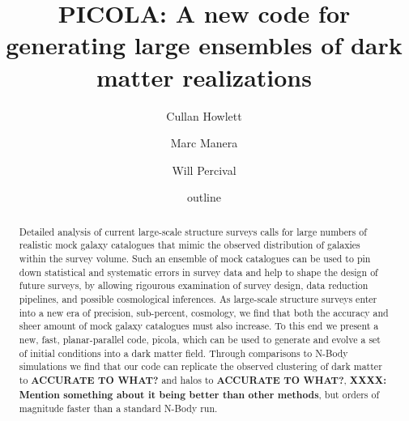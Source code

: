 \documentclass[5p,authoryear]{elsarticle}
\begin{document}
\title{PICOLA: A new code for generating large ensembles of dark matter realizations}

\author[icg]{Cullan Howlett}
\author[icg,ucl]{Marc Manera}
\author[icg]{Will Percival}
\address[icg]{Institute of Cosmology \& Gravitation, Dennis Sciama Building, University of Portsmouth, Portsmouth, PO1 3FX, UK}
\address[ucl]{ENTER UCL ADDRESS HERE...}
\date{outline} 

\begin{abstract}
Detailed analysis of current large-scale structure surveys calls for large numbers of realistic mock galaxy catalogues that mimic the observed distribution of galaxies within the survey volume. Such an ensemble of mock catalogues can be used to pin down statistical and systematic errors in survey data and help to shape the design of future surveys, by allowing rigourous examination of survey design, data reduction pipelines, and possible cosmological inferences. As large-scale structure surveys enter into a new era of precision, sub-percent, cosmology, we find that both the accuracy and sheer amount of mock galaxy catalogues must also increase. To this end we present a new, fast, planar-parallel code, {\sc picola}, which can be used to generate and evolve a set of initial conditions into a dark matter field. Through comparisons to N-Body simulations we find that our code can replicate the observed clustering of dark matter to \textbf{ACCURATE TO WHAT?} and halos to \textbf{ACCURATE TO WHAT?}, \textbf{XXXX: Mention something about it being better than other methods}, but orders of magnitude faster than a standard N-Body run. 
\end{abstract} 

\begin{keyword}
\end{keyword}

\maketitle
\end{document}
